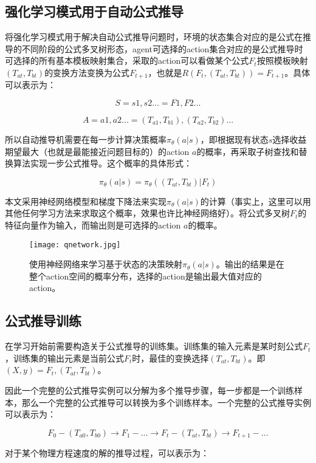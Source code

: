 \documentclass[runningheads]{llncs}
\begin{document}
\subsection{强化学习模式用于自动公式推导}
将强化学习模式用于解决自动公式推导问题时，环境的状态集合对应的是公式在推导的不同阶段的公式多叉树形态，agent可选择的action集合对应的是公式推导时可选择的所有基本模板映射集合，采取的action可以看做某个公式$F_t$按照模板映射$(T_{at},T_{bt})$的变换方法变换为公式$F_{t+1}$，也就是$R(F_t,(T_{at},T_{bt}))=F_{t+1}$。具体可以表示为：

$$S={s1,s2...}={F1,F2...}$$

$$A={a1,a2...}={(T_{a1},T_{b1}),(T_{a2},T_{b2})...}$$

所以自动推导机需要在每一步计算决策概率$\pi_{\theta}(a|s)$，即根据现有状态$s$选择收益期望最大（也就是最能接近问题目标的）的action $a$的概率，再采取子树查找和替换算法实现一步公式推导。这个概率的具体形式：

$$\pi_{\theta}(a|s)=\pi_{\theta}((T_{at},T_{bt})|F_t)$$

本文采用神经网络模型和梯度下降法来实现$\pi_{\theta}(a|s)$的计算（事实上，这里可以用其他任何学习方法来求取这个概率，效果也许比神经网络好）。将公式多叉树$F_t$的特征向量作为输入，而输出则是可选择的action $a$的概率。

\begin{figure}[H]
\centering
\texttt{[image: qnetwork.jpg]}
\caption{使用神经网络来学习基于状态的决策映射$\pi_{\theta}(a|s)$。输出的结果是在整个action空间的概率分布，选择的action是输出最大值对应的action。}
\end{figure}

\subsection{公式推导训练}
在学习开始前需要构造关于公式推导的训练集。训练集的输入元素是某时刻公式$F_t$，训练集的输出元素是当前公式$F_t$时，最佳的变换选择$(T_{at},T_{bt})$。即$(X,y)={F_t,(T_{at},T_{bt})}$。

因此一个完整的公式推导实例可以分解为多个推导步骤，每一步都是一个训练样本，那么一个完整的公式推导可以转换为多个训练样本。一个完整的公式推导实例可以表示为：

$$F_0 -(T_{a0},T_{b0})\to F_1 -...\to F_t -(T_{at},T_{bt})\to F_{t+1} -...$$

对于某个物理方程速度的解的推导过程，可以表示为：
\end{document}
